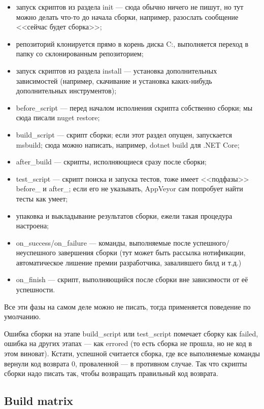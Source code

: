 \documentclass[a5paper]{article}
\begin{document}
\begin{itemize}
    \item запуск скриптов из раздела init --- сюда обычно ничего не пишут, но тут можно делать что-то до начала сборки, например, разослать сообщение <<сейчас будет сборка>>;
    \item репозиторий клонируется прямо в корень диска C:, выполняется переход в папку со склонированным репозиторием;
    \item запуск скриптов из раздела install --- установка дополнительных зависимостей (например, скачивание и установка каких-нибудь дополнительных инструментов);
    \item before\_script --- перед началом исполнения скрипта собственно сборки; мы сюда писали nuget restore;
    \item build\_script --- скрипт сборки; если этот раздел опущен, запускается msbuild; сюда можно написать, например, dotnet build для .NET Core;
    \item after\_build --- скрипты, исполняющиеся сразу после сборки;
    \item test\_script --- скрипт поиска и запуска тестов, тоже имеет <<подфазы>> before\_ и after\_; если его не указывать, AppVeyor сам попробует найти тесты как умеет;
    \item упаковка и выкладывание результатов сборки, ежели такая процедура настроена;
    \item on\_success/on\_failure --- команды, выполняемые после успешного/неуспешного завершения сборки (тут может быть рассылка нотификации, автоматическое лишение премии разработчика, завалившего билд и т.д.)
    \item on\_finish --- скрипт, выполняющийся после сборки вне зависимости от её успешности.
\end{itemize}

 Все эти фазы на самом деле можно не писать, тогда применяется поведение по умолчанию. 
 
 Ошибка сборки на этапе build\_script или test\_script помечает сборку как failed, ошибка на других этапах --- как errored (то есть сборка не прошла, но не код в этом виноват). Кстати, успешной считается сборка, где все выполняемые команды вернули код возврата 0, проваленной --- в противном случае. Так что скрипты сборки надо писать так, чтобы возвращать правильный код возврата.

\subsection{Build matrix}
\end{document}
